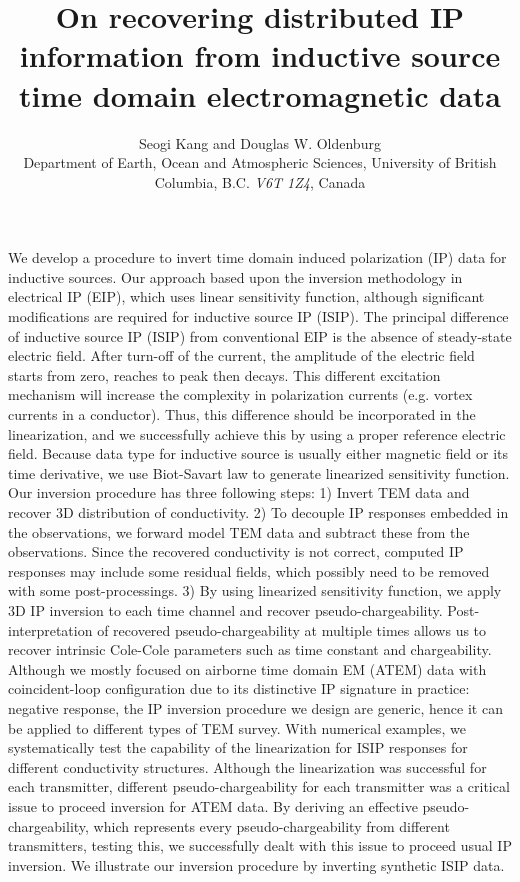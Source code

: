 \documentclass[extra,mreferee]{gji}
\author[Seogi Kang and Douglas W. Oldenburg]
   {Seogi Kang and Douglas W. Oldenburg \\
    Department of Earth, Ocean and Atmospheric Sciences,
    University of British Columbia,
    B.C. \emph{V6T 1Z4}, Canada
  }
\title{On recovering distributed IP information from inductive source time domain electromagnetic data}
\begin{document}
\label{firstpage}

\maketitle

\begin{summary}
We develop a procedure to invert time domain induced polarization (IP) data for inductive sources. 
Our approach based upon the inversion methodology in electrical IP (EIP), which uses linear sensitivity function, although significant modifications are required for inductive source IP (ISIP). 
The principal difference of inductive source IP (ISIP) from conventional EIP is the absence of steady-state electric field. 
After turn-off of the current, the amplitude of the electric field starts from zero, reaches to peak then decays. 
This different excitation mechanism will increase the complexity in polarization currents (e.g. vortex currents in a conductor).
Thus, this difference should be incorporated in the linearization, and we successfully achieve this by using a proper reference electric field. 
Because data type for inductive source is usually either magnetic field or its time derivative, we use Biot-Savart law to generate linearized sensitivity function. 
Our inversion procedure has three following steps:
1) Invert TEM data and recover 3D distribution of conductivity.
2) To decouple IP responses embedded in the observations, we forward model TEM data and subtract these from the observations. Since the recovered conductivity is not correct, computed IP responses may include some residual fields, which possibly need to be removed with some post-processings. 
3) By using linearized sensitivity function, we apply 3D IP inversion to each time channel and recover pseudo-chargeability. Post-interpretation of recovered pseudo-chargeability at multiple times allows us to recover intrinsic Cole-Cole parameters such as time constant and chargeability. 
Although we mostly focused on airborne time domain EM (ATEM) data with coincident-loop configuration due to its distinctive IP signature in practice: negative response, the IP inversion procedure we design are generic, hence it can be applied to different types of TEM survey. 
With numerical examples, we systematically test the capability of the linearization for ISIP responses for different conductivity structures. 
Although the linearization was successful for each transmitter, different pseudo-chargeability for each transmitter was a critical issue to proceed inversion for ATEM data. 
By deriving an effective pseudo-chargeability, which represents every pseudo-chargeability from different transmitters, testing this, we successfully dealt with this issue to proceed usual IP inversion. 
We illustrate our inversion procedure by inverting synthetic ISIP data.
\end{summary}
\end{document}
